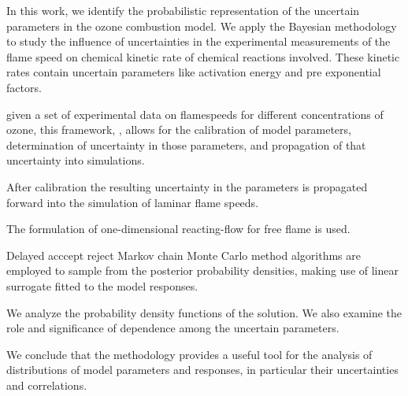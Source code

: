 

In this work, we identify the
probabilistic representation of the uncertain parameters in the ozone combustion model. We  apply the Bayesian methodology to study the influence of
uncertainties in the experimental measurements of the flame speed on chemical kinetic rate of chemical reactions involved. These kinetic rates contain uncertain parameters like activation energy and pre exponential factors. 





given a set of experimental data on flamespeeds for different concentrations of ozone, this framework, , allows for the
calibration of model parameters, determination of uncertainty in those parameters, and propagation
of that uncertainty into simulations.


After calibration the resulting uncertainty in the parameters is propagated forward into
the simulation of laminar flame speeds.


The formulation of one-dimensional
reacting-flow for free flame is used.



Delayed acccept reject Markov chain Monte Carlo method 
algorithms are employed to sample from the posterior probability densities, making use of
linear surrogate fitted to the model responses.

We analyze the  probability density functions of the solution. We
also examine the role and significance of dependence among the uncertain parameters. 





We conclude that the
methodology provides a useful tool for the analysis of distributions of model parameters and
responses, in particular their uncertainties and correlations.


